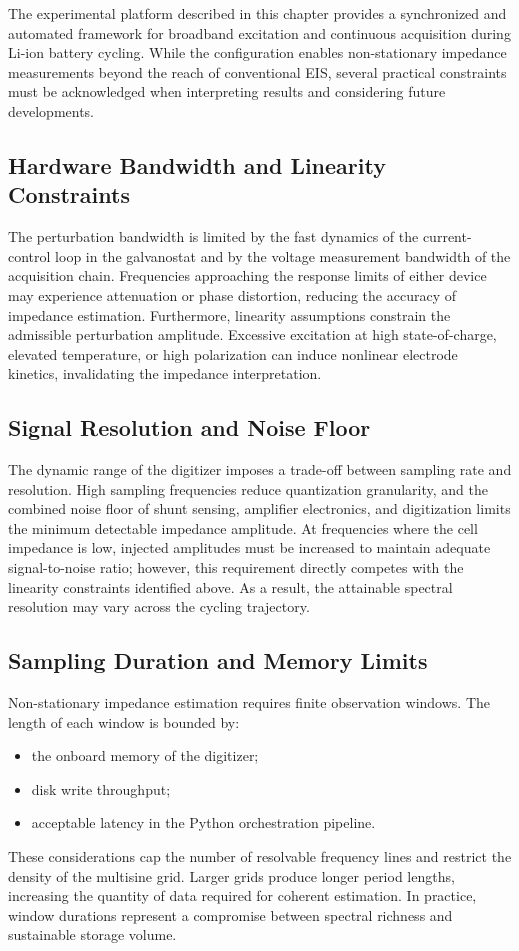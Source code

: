 The experimental platform described in this chapter provides a synchronized and automated framework for broadband excitation and continuous acquisition during Li-ion battery cycling. While the configuration enables non-stationary impedance measurements beyond the reach of conventional EIS, several practical constraints must be acknowledged when interpreting results and considering future developments.

\subsection{Hardware Bandwidth and Linearity Constraints}

The perturbation bandwidth is limited by the fast dynamics of the current-control loop in the galvanostat and by the voltage measurement bandwidth of the acquisition chain. Frequencies approaching the response limits of either device may experience attenuation or phase distortion, reducing the accuracy of impedance estimation. Furthermore, linearity assumptions constrain the admissible perturbation amplitude. Excessive excitation at high state-of-charge, elevated temperature, or high polarization can induce nonlinear electrode kinetics, invalidating the impedance interpretation.

\subsection{Signal Resolution and Noise Floor}

The dynamic range of the digitizer imposes a trade-off between sampling rate and resolution. High sampling frequencies reduce quantization granularity, and the combined noise floor of shunt sensing, amplifier electronics, and digitization limits the minimum detectable impedance amplitude. At frequencies where the cell impedance is low, injected amplitudes must be increased to maintain adequate signal-to-noise ratio; however, this requirement directly competes with the linearity constraints identified above. As a result, the attainable spectral resolution may vary across the cycling trajectory.

\subsection{Sampling Duration and Memory Limits}

Non-stationary impedance estimation requires finite observation windows. The length of each window is bounded by:
\begin{itemize}
    \item the onboard memory of the digitizer;
    \item disk write throughput;
    \item acceptable latency in the Python orchestration pipeline.
\end{itemize}
These considerations cap the number of resolvable frequency lines and restrict the density of the multisine grid. Larger grids produce longer period lengths, increasing the quantity of data required for coherent estimation. In practice, window durations represent a compromise between spectral richness and sustainable storage volume.


